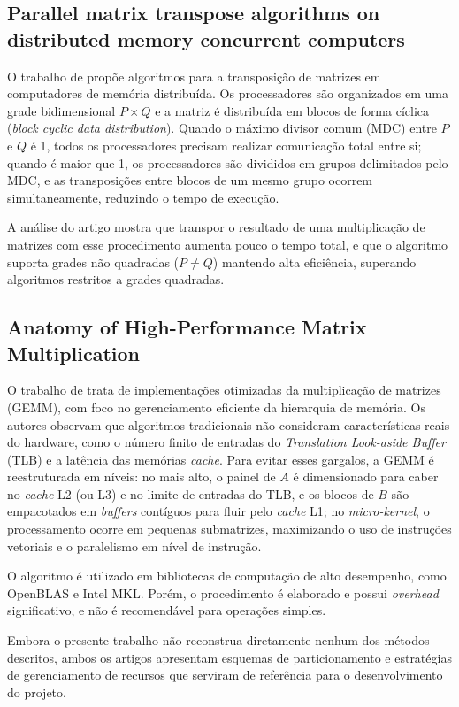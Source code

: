 \documentclass[12pt]{article}
\begin{document}
\subsection{Parallel matrix transpose algorithms on distributed memory concurrent computers}
O trabalho de \cite{art1} propõe algoritmos para a transposição de matrizes em computadores de memória distribuída. Os processadores são organizados em uma grade bidimensional $P \times Q$ e a matriz é distribuída em blocos de forma cíclica (\textit{block cyclic data distribution}). Quando o máximo divisor comum (MDC) entre $P$ e $Q$ é 1, todos os processadores precisam realizar comunicação total entre si; quando é maior que 1, os processadores são divididos em grupos delimitados pelo MDC, e as transposições entre blocos de um mesmo grupo ocorrem simultaneamente, reduzindo o tempo de execução.
\par
A análise do artigo mostra que transpor o resultado de uma multiplicação de matrizes com esse procedimento aumenta pouco o tempo total, e que o algoritmo suporta grades não quadradas ($P \neq Q$) mantendo alta eficiência, superando algoritmos restritos a grades quadradas. 

\subsection{Anatomy of High-Performance Matrix Multiplication}
O trabalho de \cite{art2} trata de implementações otimizadas da multiplicação de matrizes (GEMM), com foco no gerenciamento eficiente da hierarquia de memória. Os autores observam que algoritmos tradicionais não consideram características reais do hardware, como o número finito de entradas do \textit{Translation Look-aside Buffer} (TLB) e a latência das memórias \textit{cache}. Para evitar esses gargalos, a GEMM é reestruturada em níveis: no mais alto, o painel de $A$ é dimensionado para caber no \textit{cache} L2 (ou L3) e no limite de entradas do TLB, e os blocos de $B$ são empacotados em \textit{buffers} contíguos para fluir pelo \textit{cache} L1; no \textit{micro-kernel}, o processamento ocorre em pequenas submatrizes, maximizando o uso de instruções vetoriais e o paralelismo em nível de instrução.
\par
O algoritmo é utilizado em bibliotecas de computação de alto desempenho, como OpenBLAS e Intel MKL. Porém, o procedimento é elaborado e possui \textit{overhead} significativo, e não é recomendável para operações simples.
\par
Embora o presente trabalho não reconstrua diretamente nenhum dos métodos descritos, ambos os artigos apresentam esquemas de particionamento e estratégias de gerenciamento de recursos que serviram de referência para o desenvolvimento do projeto.
\end{document}
